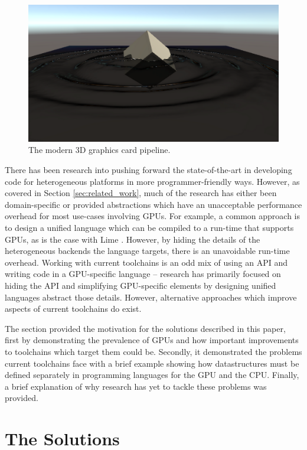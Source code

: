 \documentclass[a4paper,12pt,twoside,openright]{report}
\begin{document}
\begin{figure}[h]
\centering
\includegraphics[width=0.8\linewidth]{waveparticles_example}
\caption{The modern 3D graphics card pipeline.}
\label{fig:waveparticles_example}
\end{figure}

There has been research into pushing forward the state-of-the-art in developing
code for heterogeneous platforms in more programmer-friendly ways. However, as
covered in Section \ref{sec:related_work}, much of the research has either been
domain-specific or provided abstractions which have an unacceptable performance
overhead for most use-cases involving GPUs. For example, a common approach is
to design a unified language which can be compiled to a run-time that supports
GPUs, as is the case with Lime \cite{Lime2010}. However, by hiding the details
of the heterogeneous backends the language targets, there is an unavoidable
run-time overhead. Working with current toolchains is an odd mix of using an
API and writing code in a GPU-specific language -- research has primarily
focused on hiding the API and simplifying GPU-specific elements by designing
unified languages abstract those details. However, alternative approaches which
improve aspects of current toolchains do exist.

The section provided the motivation for the solutions described in this paper,
first by demonstrating the prevalence of GPUs and how important improvements to
toolchains which target them could be. Secondly, it demonstrated the problems
current toolchains face with a brief example showing how datastructures must be
defined separately in programming languages for the GPU and the CPU. Finally, a
brief explanation of why research has yet to tackle these problems was
provided.

\section{The Solutions}
\end{document}
